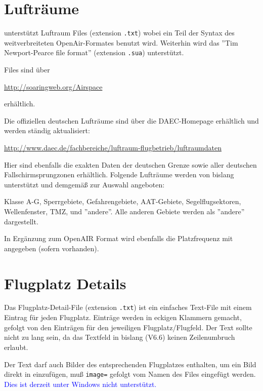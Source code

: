 \section{Lufträume}

\xc unterstützt Luftraum Files (extension \verb|.txt|) wobei ein Teil der Syntax
des weitverbreiteten OpenAir-Formates benutzt wird. Weiterhin wird das ''Tim Newport-Pearce file format''
(extension \verb|.sua|) unterstützt.

Files sind über
\begin{center}
\url{http://soaringweb.org/Airspace}
\end{center}
 erhältlich.

Die offiziellen deutschen Lufträume sind über die DAEC-Homepage erhältlich und werden ständig
aktualisiert:
\begin{center}
\url{http://www.daec.de/fachbereiche/luftraum-flugbetrieb/luftraumdaten}
\end{center}

Hier sind ebenfalls die exakten Daten der deutschen Grenze sowie aller deutschen Fallschirmsprungzonen
erhältlich. Folgende Lufträume werden von \xc bislang unterstützt und demgemäß zur Auswahl angeboten:

Klasse A-G, Sperrgebiete, Gefahrengebiete, AAT-Gebiete, Segelflugsektoren, Wellenfenster, TMZ, und
''andere''.  Alle anderen Gebiete werden als ''andere'' dargestellt.

In Ergänzung zum OpenAIR Format wird ebenfalls die Platzfrequenz mit angegeben (sofern vorhanden).

\section{Flugplatz Details}\label{sec:airfield-details}

Das Flugplatz-Detail-File  (extension \verb|.txt|) ist ein einfaches Text-File mit einem Eintrag für jeden
Flugplatz. Einträge werden in eckigen Klammern gemacht, gefolgt von den Einträgen für den jeweiligen
Flugplatz/Flugfeld. Der Text sollte nicht zu lang sein, da das Textfeld in  \xc bislang (V6.6) keinen Zeilenumbruch
erlaubt.

Der Text darf auch Bilder des entsprechenden Flugplatzes enthalten, um ein Bild direkt in \xc einzufügen,
muß  \verb|image=| gefolgt vom Namen des Files eingefügt werden. \textcolor{blue}{Dies ist derzeit unter Windows nicht unterstützt.}\achtung 

